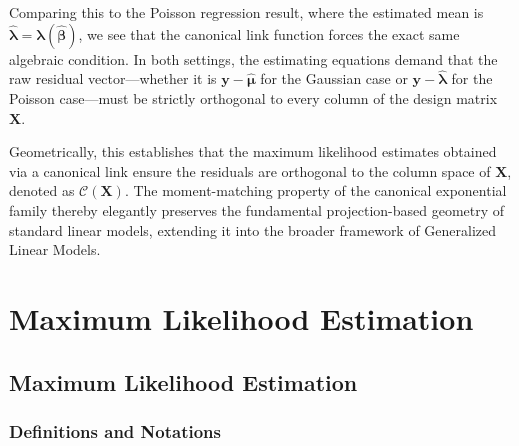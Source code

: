\documentclass[
  letterpaper,
  DIV=11,
  numbers=noendperiod]{scrreprt}
\renewcommand{\[}{\begin{equation}}
\renewcommand{\]}{\end{equation}}
\theoremstyle{definition}
\theoremstyle{plain}
\theoremstyle{plain}
\theoremstyle{plain}
\theoremstyle{definition}
\theoremstyle{plain}
\theoremstyle{remark}
\begin{document}
Comparing this to the Poisson regression result, where the estimated
mean is
\(\hat{\boldsymbol{\lambda}} = \boldsymbol{\lambda}(\hat{\boldsymbol{\beta}})\),
we see that the canonical link function forces the exact same algebraic
condition. In both settings, the estimating equations demand that the
raw residual vector---whether it is
\(\mathbf{y} - \hat{\boldsymbol{\mu}}\) for the Gaussian case or
\(\mathbf{y} - \hat{\boldsymbol{\lambda}}\) for the Poisson case---must
be strictly orthogonal to every column of the design matrix
\(\mathbf{X}\).

Geometrically, this establishes that the maximum likelihood estimates
obtained via a canonical link ensure the residuals are orthogonal to the
column space of \(\mathbf{X}\), denoted as \(\mathcal{C}(\mathbf{X})\).
The moment-matching property of the canonical exponential family thereby
elegantly preserves the fundamental projection-based geometry of
standard linear models, extending it into the broader framework of
Generalized Linear Models.


\chapter{Maximum Likelihood
Estimation}\label{maximum-likelihood-estimation}

\section{Maximum Likelihood
Estimation}\label{maximum-likelihood-estimation-1}

\subsection{Definitions and
Notations}\label{definitions-and-notations-1}
\end{document}
